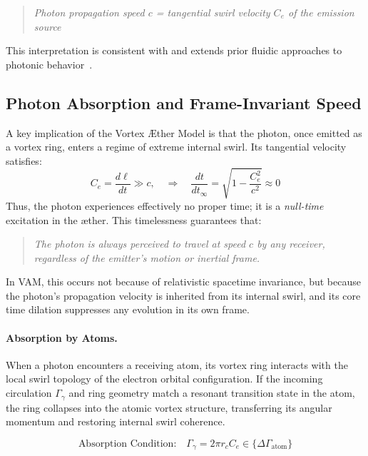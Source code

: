         \begin{quote}
            \emph{Photon propagation speed $c$ =  tangential swirl velocity  $C_e$  of the emission source}
        \end{quote}

        This interpretation is consistent with and extends prior fluidic approaches to photonic behavior~\cite{VAM-1, barut1990, berry2000}.

\subsection{Photon Absorption and Frame-Invariant Speed}

        A key implication of the Vortex \AE ther Model is that the photon, once emitted as a vortex ring, enters a regime of extreme internal swirl. Its tangential velocity satisfies:
        \begin{equation}
            C_e = \frac{d\ell}{dt} \gg c, \quad \Rightarrow \quad \frac{dt}{dt_\infty} = \sqrt{1 - \frac{C_e^2}{c^2}} \approx 0
        \end{equation}
        Thus, the photon experiences effectively no proper time; it is a \emph{null-time} excitation in the \ae ther. This timelessness guarantees that:

        \begin{quote}
            \emph{The photon is always perceived to travel at speed $c$ by any receiver, regardless of the emitter’s motion or inertial frame.}
        \end{quote}

        In VAM, this occurs not because of relativistic spacetime invariance, but because the photon's propagation velocity is inherited from its internal swirl, and its core time dilation suppresses any evolution in its own frame.

        \paragraph{Absorption by Atoms.} When a photon encounters a receiving atom, its vortex ring interacts with the local swirl topology of the electron orbital configuration. If the incoming circulation $\Gamma_\gamma$ and ring geometry match a resonant transition state in the atom, the ring collapses into the atomic vortex structure, transferring its angular momentum and restoring internal swirl coherence.

        \begin{equation}
            \text{Absorption Condition:} \quad \Gamma_\gamma = 2\pi r_c C_e \in \{ \Delta \Gamma_{\text{atom}} \}
        \end{equation}

